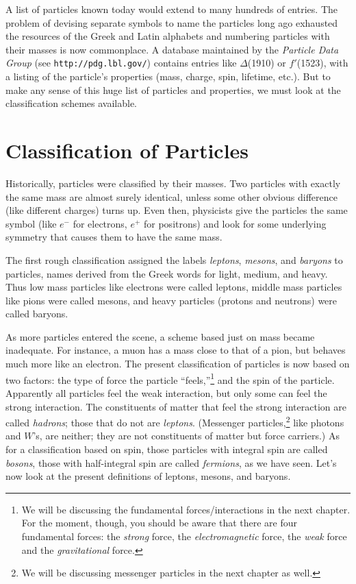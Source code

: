 A list of particles known today would extend to many hundreds of
entries.  The problem of devising separate symbols to name the
particles long ago exhausted the resources of the Greek and Latin
alphabets and numbering particles with their masses is now
commonplace.  A database maintained by the \textit{Particle Data
Group} (see \verb+http://pdg.lbl.gov/+)  contains entries 
like $\Delta$(1910) or $f'$(1523), with a listing of the particle's 
properties (mass, charge, spin, lifetime,
etc.).  But to make any sense of this huge list of particles and
properties, we must look at the classification schemes available.

\section{Classification of Particles}
\label{sec:particle_classification}

Historically, particles were classified by their masses.  Two
particles with exactly the same mass are almost surely identical,
unless some other obvious difference (like different charges)
turns up. Even then, physicists give the particles the same symbol
(like $e^-$ for electrons, $e^+$ for positrons) and look for some
underlying symmetry that causes them to have the same mass.

The first rough classification assigned the labels {\em leptons}, {\em
mesons}, and {\em baryons} to particles, names derived from the Greek
words for light, medium, and heavy.  Thus low mass particles like
electrons were called leptons, middle mass particles like pions were
called mesons, and heavy particles (protons and neutrons) were called
baryons.

As more particles entered the scene, a scheme based just on mass
became inadequate.  For instance, a muon has a mass close to that
of a pion, but behaves much more like an electron.  The present
classification of particles is now based on two factors: the type
of force the particle ``feels,''\footnote{We will be discussing
the fundamental forces/interactions in the next chapter.  For the
moment, though, you should be aware that there are four
fundamental forces: the \textit{strong} force, the
\textit{electromagnetic} force, the \textit{weak} force and the
\textit{gravitational} force.} and the spin of the particle. Apparently
all particles feel the weak interaction, but only some can feel
the strong interaction. The constituents of matter that feel the
strong interaction are called {\em hadrons}; those that do not are
{\em leptons}.  (Messenger particles,\footnote{We will be
discussing messenger particles in the next chapter as well.} like
photons and $W$'s, are neither; they are not constituents of
matter but force carriers.) As for a classification based on spin,
those particles with integral spin are called {\em bosons}, those
with half-integral spin are called {\em fermions}, as we have
seen. Let's now look at the present definitions of leptons,
mesons, and baryons.

